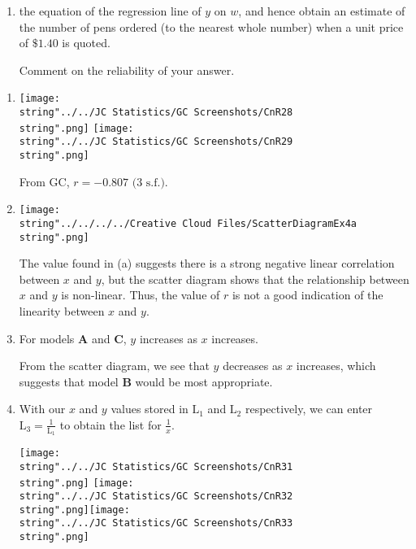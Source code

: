 \documentclass[11pt,a4paper]{book}
\begin{document}
\begin{example}
\begin{enumerate}[label=(\alph*),start=4]
\item  the equation of the regression line of $y$ on $w$, and hence
obtain an estimate of the number of pens ordered (to the nearest whole
number) when a unit price of $\$1.40$ is quoted.

Comment on the reliability of your answer.

\end{enumerate}

\Solution

\begin{enumerate}[label=(\alph*)]

\item  \texttt{[image: \\string"../../JC Statistics/GC Screenshots/CnR28\\string".png]}
\hspace{1cm}\texttt{[image: \\string"../../JC Statistics/GC Screenshots/CnR29\\string".png]}

From GC, $r=-0.807\text{ (3 s.f.)}$.

\item \begin{minipage}[t]{.4\textwidth}\texttt{[image: \\string"../../../../Creative Cloud Files/ScatterDiagramEx4a\\string".png]}

\end{minipage}
\begin{minipage}[t]{.45\textwidth}

The value found in (a) suggests there is a strong negative linear
correlation between $x$ and $y$, but the scatter diagram shows that
the relationship between $x$ and $y$ is non-linear. Thus, the value
of $r$ is not a good indication of the linearity between $x$ and
$y$.

\end{minipage}

\item  For models $\textbf{A}$ and $\textbf{C}$, $y$ increases
as $x$ increases.

From the scatter diagram, we see that $y$ decreases as $x$ increases,
which suggests that model $\textbf{B}$ would be most appropriate.

\item  With our $x$ and $y$ values stored in $\text{L}_{1}$ and
$\text{L}_{2}$ respectively, we can enter ${\displaystyle \text{L}_{3}=\frac{1}{\text{L}_{1}}}$
to obtain the list for ${\displaystyle \frac{1}{x}}$.

\texttt{[image: \\string"../../JC Statistics/GC Screenshots/CnR31\\string".png]}
\hspace{1cm}\texttt{[image: \\string"../../JC Statistics/GC Screenshots/CnR32\\string".png]}\hspace{1cm}\texttt{[image: \\string"../../JC Statistics/GC Screenshots/CnR33\\string".png]}


\end{enumerate}
\end{example}
\end{document}

